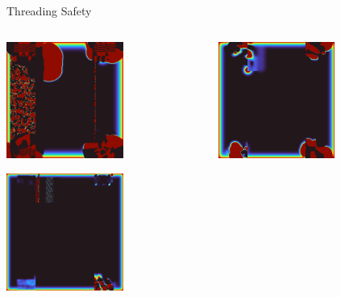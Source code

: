 \placelogofalse
\begin{frame}{Threading Safety}
  \begin{columns}
  \begin{center}
  \centering
  \includegraphics[width=0.6\textwidth]{glitch_01.png}

  \vspace{0.1cm}

  \includegraphics[width=0.6\textwidth]{glitch_02.png}
  \end{center}

  \begin{center}
  \centering
  \includegraphics[width=0.6\textwidth]{glitch_03.png}


\end{center}
\end{columns}
\end{frame}

